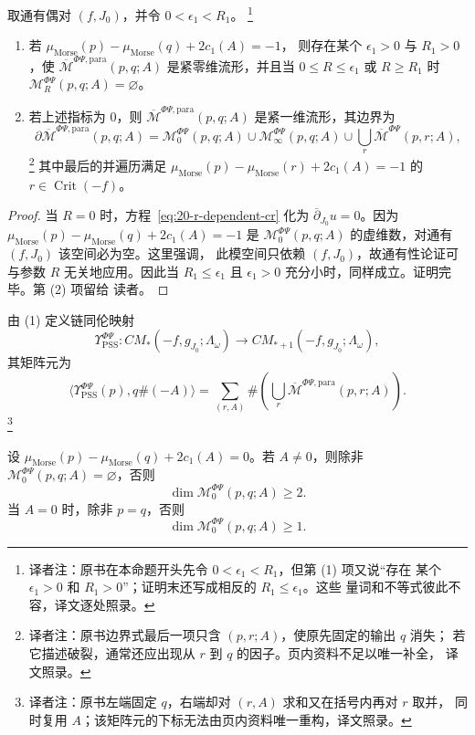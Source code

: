 \begin{proposition}
\label{prop:20-psi-phi-compactification}
取通有偶对 $(f,J_0)$，并令 $0<\epsilon_1<R_1$。
\footnote{译者注：原书在本命题开头先令 $0<\epsilon_1<R_1$，但第 (1) 项又说“存在
某个 $\epsilon_1>0$ 和 $R_1>0$”；证明末还写成相反的 $R_1\leq\epsilon_1$。这些
量词和不等式彼此不容，译文逐处照录。}
\begin{enumerate}[label=(\arabic*)]
\item 若 $\mu_{\mathrm{Morse}}(p)-\mu_{\mathrm{Morse}}(q)+2c_1(A)=-1$，
则存在某个 $\epsilon_1>0$ 与 $R_1>0$，使
$\overline{\mathcal M}^{\Phi\Psi,\mathrm{para}}(p,q;A)$ 是紧零维流形，并且当
$0\leq R\leq\epsilon_1$ 或 $R\geq R_1$ 时
$\mathcal M_R^{\Phi\Psi}(p,q;A)=\varnothing$。
\item 若上述指标为 $0$，则
$\overline{\mathcal M}^{\Phi\Psi,\mathrm{para}}(p,q;A)$ 是紧一维流形，其边界为
\[
 \partial\overline{\mathcal M}^{\Phi\Psi,\mathrm{para}}(p,q;A)
 =\mathcal M_0^{\Phi\Psi}(p,q;A)\cup\mathcal M_\infty^{\Phi\Psi}(p,q;A)
 \cup\bigcup_r\overline{\mathcal M}^{\Phi\Psi}(p,r;A),
\]
\footnote{译者注：原书边界式最后一项只含 $(p,r;A)$，使原先固定的输出 $q$ 消失；
若它描述\personMorse{}破裂，通常还应出现从 $r$ 到 $q$ 的因子。页内资料不足以唯一补全，
译文照录。}
其中最后的并遍历满足
$\mu_{\mathrm{Morse}}(p)-\mu_{\mathrm{Morse}}(r)+2c_1(A)=-1$ 的
$r\in\operatorname{Crit}(-f)$。
\end{enumerate}
\end{proposition}

\begin{proof}
当 $R=0$ 时，方程~\eqref{eq:20-r-dependent-cr} 化为
$\overline\partial_{J_0}u=0$。因为
$\mu_{\mathrm{Morse}}(p)-\mu_{\mathrm{Morse}}(q)+2c_1(A)=-1$ 是
$\mathcal M_0^{\Phi\Psi}(p,q;A)$ 的虚维数，对通有 $(f,J_0)$ 该空间必为空。这里强调，
此模空间只依赖 $(f,J_0)$，故通有性论证可与参数 $R$ 无关地应用。因此当
$R_1\leq\epsilon_1$ 且 $\epsilon_1>0$ 充分小时，同样成立。证明完毕。第 (2) 项留给
读者。
\end{proof}

由 (1) 定义链同伦映射
\[
 \Upsilon_{\mathrm{PSS}}^{\Phi\Psi}:
 CM_*(-f,g_{J_0};\Lambda_\omega)\to CM_{*+1}(-f,g_{J_0};\Lambda_\omega),
\]
其矩阵元为
\[
 \langle\Upsilon_{\mathrm{PSS}}^{\Phi\Psi}(p),q\#(-A)\rangle
 =\sum_{(r,A)}\#\left(\bigcup_r
 \overline{\mathcal M}^{\Phi\Psi,\mathrm{para}}(p,r;A)\right).
\]
\footnote{译者注：原书左端固定 $q$，右端却对 $(r,A)$ 求和又在括号内再对 $r$ 取并，
同时复用 $A$；该矩阵元的下标无法由页内资料唯一重构，译文照录。}

\begin{lemma}
\label{lem:20-zero-end-dimension}
设 $\mu_{\mathrm{Morse}}(p)-\mu_{\mathrm{Morse}}(q)+2c_1(A)=0$。若 $A\neq0$，则除非
$\mathcal M_0^{\Phi\Psi}(p,q;A)=\varnothing$，否则
\[
 \dim\mathcal M_0^{\Phi\Psi}(p,q;A)\geq2.
\]
当 $A=0$ 时，除非 $p=q$，否则
\[
 \dim\mathcal M_0^{\Phi\Psi}(p,q;A)\geq1.
\]
\end{lemma}

